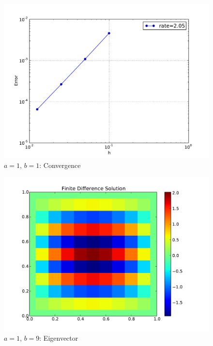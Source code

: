 \documentclass[10pt,letterpaper]{article}
\begin{document}
\begin{figure}[p]
\begin{center}
\includegraphics[width=5in,keepaspectratio]{be11.pdf}
\end{center}
\caption{$a=1$, $b=1$: Convergence}
\end{figure}

\begin{figure}[p]
\begin{center}
\includegraphics[width=5in,keepaspectratio]{b19.pdf}
\end{center}
\caption{$a=1$, $b=9$: Eigenvector}
\end{figure}
\end{document}
